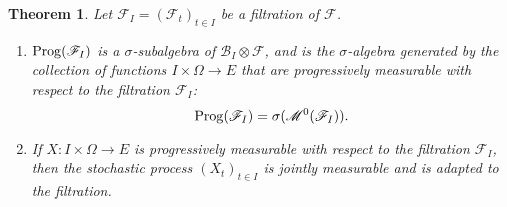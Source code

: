 \documentclass{article}
\newcommand{\Prog}{\ensuremath\mathrm{Prog}}
\newtheorem{theorem}{Theorem}
\theoremstyle{definition}
\begin{document}
\begin{theorem}
Let $\mathscr{F}_I=(\mathscr{F}_t)_{t \in I}$ be a filtration of $\mathscr{F}$.
\begin{enumerate}
\item $\Prog(\mathscr{F}_I)$ is a $\sigma$-subalgebra of $\mathscr{B}_I \otimes \mathscr{F}$, and  is the
$\sigma$-algebra generated by the collection of functions $I \times \Omega \to E$ that 
are progressively measurable with respect to the filtration $\mathscr{F}_I$:
\[
\Prog(\mathscr{F}_I)=\sigma(\mathscr{M}^0(\mathscr{F}_I)).
\]
\item If $X:I \times \Omega \to E$ is progressively measurable with respect to the filtration
$\mathscr{F}_I$, then the stochastic process $(X_t)_{t \in I}$ is jointly measurable and is adapted to the filtration.
\end{enumerate}
\end{theorem}
\end{document}
